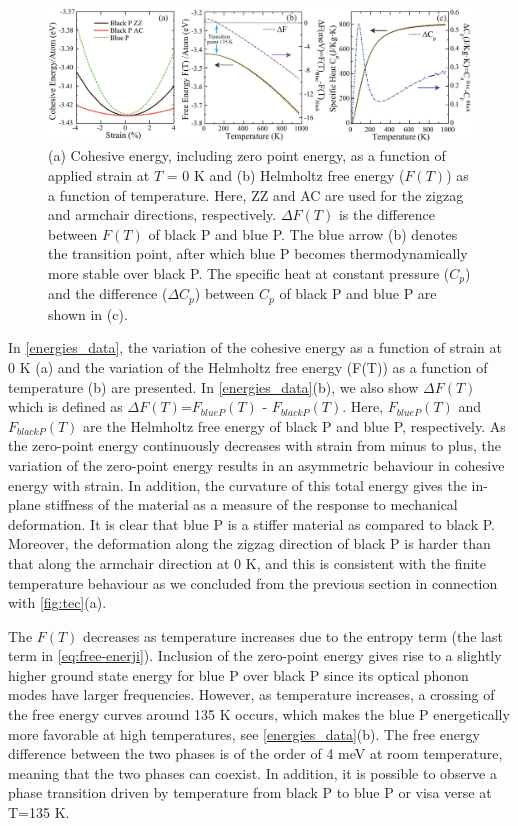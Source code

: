 \begin{figure}[htbp]
\centering
\includegraphics[width=\linewidth]{freeE_T.eps}%
\caption[Thermal properties variations of phosphorene with temperature]{(a) Cohesive energy, including zero point energy, as a function of applied strain at $T$ = 0 K and (b) Helmholtz free energy ($F(T)$) as a function of temperature.  Here, ZZ and AC are used for the zigzag and armchair directions, respectively. $\Delta F(T)$ is the difference between $F(T)$ of black P and blue P. The blue arrow  (b) denotes the transition point, after which blue P becomes thermodynamically more stable over black P.  The specific heat at constant pressure ($C_p$) and the difference ($\Delta C_p$) between $C_p$ of black P and blue P are shown in (c).  \label{energies_data}}
\end{figure}

In \autoref{energies_data}, the variation of the cohesive energy as a function of strain at 0 K (a) and the variation of the Helmholtz free energy (F(T)) as a function of temperature (b) are presented. In \autoref{energies_data}(b), 
we also show $\Delta F(T)$ which is defined as $\Delta F(T)$=$F_{blue P}(T)$ - $F_{black P}(T)$. Here, $F_{blue P}(T)$ and $F_{black P}(T)$ are the Helmholtz free energy of black P and blue P, respectively. As the zero-point energy continuously decreases with strain from minus to plus, the variation of the zero-point energy results in an asymmetric behaviour in cohesive energy with strain. In addition, the curvature of this total energy gives the in-plane stiffness of the material as a measure of the response to mechanical deformation. It is clear that blue P is a stiffer material as compared to black P.  Moreover, the deformation along the zigzag direction of black P is harder than that along the armchair direction at 0 K, and this is consistent with the finite temperature behaviour as we concluded from the previous section in connection with \autoref{fig:tec}(a). 

The $F(T)$ decreases as temperature increases due to the entropy term (the last term in \autoref{eq:free-enerji}). Inclusion of the zero-point energy gives rise to a slightly higher ground state energy for blue P over black P since its optical phonon modes have larger frequencies. However, as temperature increases, a crossing of the free energy curves around 135 K occurs, which makes the blue P energetically more favorable at high temperatures, see \autoref{energies_data}(b). The free energy difference between the two phases is of the order of 4 meV at room temperature, meaning that the two phases can coexist. In addition, it is possible to observe a phase transition driven by temperature from black P to blue P or visa verse at T=135 K. 

